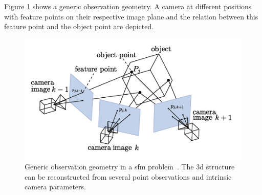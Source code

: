 Figure \ref{fig:sfm_geometry} shows a generic observation geometry. A camera at different positions with feature points on their respective image plane and the relation between this feature point and the object point are depicted. 

\begin{figure}[htb]
    \centering
    \includegraphics[width=\textwidth]{doc/thesis/0_figures/sfm/sfm_geometry.png}
    \caption{Generic observation geometry in a \gls{sfm} problem~\cite{andrews2019asteroid}. The \gls{3d} structure can be reconstructed from several point observations and intrinsic camera parameters.}
    \label{fig:sfm_geometry}
\end{figure}

